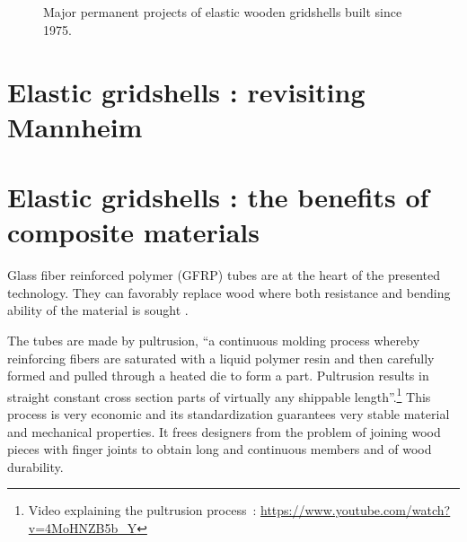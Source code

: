 \begin{figure}[p]
	\begin{fullpage}
		\captionsetup[subfloat]{captionskip=10pt}
     		\centering
		\hspace*{\fill}
		 \\
		\hspace*{\fill}
		 \\
		\hspace*{\fill}
		\vspace{20pt}
		\caption{Major permanent projects of elastic wooden gridshells built since 1975.}
		\label{fig:projects}    
	\end{fullpage}
\end{figure}


\section{Elastic gridshells : revisiting Mannheim}


\section{Elastic gridshells : the benefits of composite materials}

Glass fiber reinforced polymer (GFRP) tubes are at the heart of the presented technology. They can favorably replace wood where both resistance and bending ability of the material is sought \cite{Douthe2010}. 

The tubes are made by pultrusion, \enquote{a continuous molding process whereby reinforcing fibers are saturated with a liquid polymer resin and then carefully formed and pulled through a heated die to form a part. Pultrusion results in straight constant cross section parts of virtually any shippable length}.\footnote{Video explaining the pultrusion process~: \url{https://www.youtube.com/watch?v=4MoHNZB5b_Y}} This process is very economic and its standardization guarantees very stable material and mechanical properties. It frees designers from the problem of joining wood pieces with finger joints to obtain long and continuous members and of wood durability.

